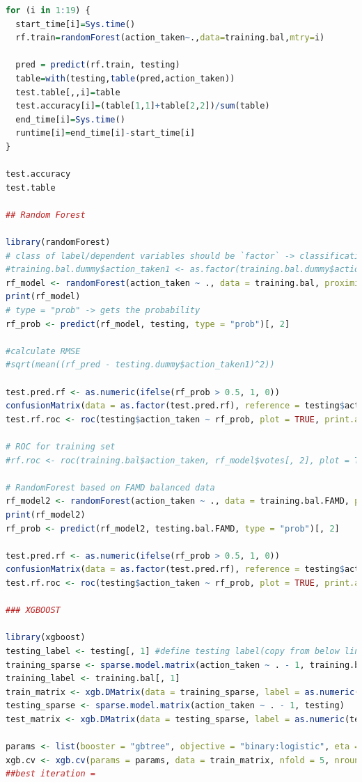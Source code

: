\documentclass{jpp}
\begin{document}
\begin{lstlisting}[language=R]
for (i in 1:19) {
  start_time[i]=Sys.time()
  rf.train=randomForest(action_taken~.,data=training.bal,mtry=i)

  pred = predict(rf.train, testing)
  table=with(testing,table(pred,action_taken))
  test.table[,,i]=table
  test.accuracy[i]=(table[1,1]+table[2,2])/sum(table)
  end_time[i]=Sys.time()
  runtime[i]=end_time[i]-start_time[i]
}

test.accuracy
test.table

## Random Forest

library(randomForest)
# class of label/dependent variables should be `factor` -> classification
#training.bal.dummy$action_taken1 <- as.factor(training.bal.dummy$action_taken1)
rf_model <- randomForest(action_taken ~ ., data = training.bal, proximity = TRUE)
print(rf_model)
# type = "prob" -> gets the probability
rf_prob <- predict(rf_model, testing, type = "prob")[, 2]

#calculate RMSE
#sqrt(mean((rf_pred - testing.dummy$action_taken1)^2))

test.pred.rf <- as.numeric(ifelse(rf_prob > 0.5, 1, 0))
confusionMatrix(data = as.factor(test.pred.rf), reference = testing$action_taken, positive = "1")
test.rf.roc <- roc(testing$action_taken ~ rf_prob, plot = TRUE, print.auc = TRUE)

# ROC for training set
#rf.roc <- roc(training.bal$action_taken, rf_model$votes[, 2], plot = TRUE, print.auc = TRUE)

# RandomForest based on FAMD balanced data
rf_model2 <- randomForest(action_taken ~ ., data = training.bal.FAMD, proximity = TRUE)
print(rf_model2)
rf_prob <- predict(rf_model2, testing.bal.FAMD, type = "prob")[, 2]

test.pred.rf <- as.numeric(ifelse(rf_prob > 0.5, 1, 0))
confusionMatrix(data = as.factor(test.pred.rf), reference = testing$action_taken, positive = "1")
test.rf.roc <- roc(testing$action_taken ~ rf_prob, plot = TRUE, print.auc = TRUE)

### XGBOOST

library(xgboost)
testing_label <- testing[, 1] #define testing label(copy from below lines)
training_sparse <- sparse.model.matrix(action_taken ~ . - 1, training.bal)
training_label <- training.bal[, 1]
train_matrix <- xgb.DMatrix(data = training_sparse, label = as.numeric(training_label) - 1)
testing_sparse <- sparse.model.matrix(action_taken ~ . - 1, testing)
test_matrix <- xgb.DMatrix(data = testing_sparse, label = as.numeric(testing_label) - 1)

params <- list(booster = "gbtree", objective = "binary:logistic", eta = 0.3, gamma = 0, max_depth = 6, min_child_weight = 1, subsample = 1, colsample_bytree = 1)
xgb.cv <- xgb.cv(params = params, data = train_matrix, nfold = 5, nrounds = 100)
##best iteration =


\end{lstlisting}
\end{document}
